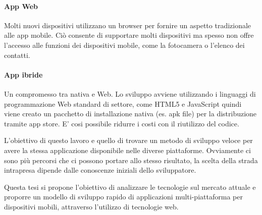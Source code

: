 \documentclass[11pt, oneside]{Thesis} %
\begin{document}
{\paragraph*{App Web} Molti nuovi dispositivi utilizzano un browser per fornire un aspetto tradizionale alle app mobile. Ciò consente di supportare molti dispositivi ma spesso non offre l'accesso alle funzioni dei dispositivi mobile, come la fotocamera o l'elenco dei contatti.

\paragraph*{App ibride} Un compromesso tra nativa e Web. Lo sviluppo avviene utilizzando i linguaggi di programmazione Web standard di settore, come HTML5 e JavaScript quindi viene creato un pacchetto di installazione nativa (es. apk file) per la distribuzione tramite app store. E' cosi possibile ridurre i costi con il riutilizzo del codice.

L'obiettivo di questo lavoro e quello di trovare un metodo di sviluppo veloce per avere la stessa applicazione disponibile nelle diverse piattaforme. Ovviamente ci sono più percorsi che ci possono portare allo stesso risultato, la scelta della strada intrapresa dipende dalle conoscenze iniziali dello sviluppatore. 

Questa tesi si propone l'obiettivo di analizzare le tecnologie sul mercato attuale e proporre un modello di sviluppo rapido di applicazioni multi-piattaforma per dispositivi mobili, attraverso l'utilizzo di tecnologie web.

}

\clearpage %



\clearpage %

\end{document}
